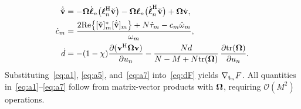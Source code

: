 \documentclass[journal]{IEEEtran}
\begin{document}
\begin{align}
\dot{\check{\mathbf{v}}}&=-\boldsymbol{\Omega}\dot{\boldsymbol{\ell}}_n\big(\boldsymbol{\ell}_n^{\mathrm H}\check{\mathbf{v}}\big)-\boldsymbol{\Omega}\boldsymbol{\ell}_n\big(\dot{\boldsymbol{\ell}}_n^{\mathrm H}\check{\mathbf{v}}\big)+\boldsymbol{\Omega}\dot{\mathbf{v}},\label{eq:a4}\\
\dot c_m&=\frac{2\mathrm{Re}\big\{[\check{\mathbf{v}}]_m^*[\dot{\check{\mathbf{v}}}]_m\big\}+N\dot\tau_m-c_m\dot\omega_m}{\omega_m},\label{eq:a5}\\
\dot d&=-(1-\chi)\frac{\partial(\mathbf{v}^{\mathrm H}\boldsymbol{\Omega}\mathbf{v})}{\partial u_n}-\frac{Nd}{N-M+N\mathrm{tr}(\boldsymbol{\Omega})}\,\frac{\partial\mathrm{tr}(\boldsymbol{\Omega})}{\partial u_n}.\label{eq:a7}
\end{align}
Substituting~\eqref{eq:a1}, \eqref{eq:a5}, and~\eqref{eq:a7} into~\eqref{eq:dF} yields $\nabla_{\mathbf{t}_n}F$. All quantities in~\eqref{eq:a1}--\eqref{eq:a7} follow from matrix-vector products with $\boldsymbol{\Omega}$, requiring $\mathcal O(M^2)$ operations.
\end{document}
